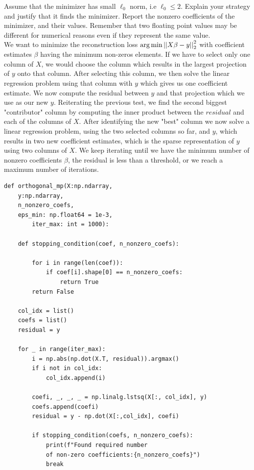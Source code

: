 \documentclass[12pt,twoside]{article}
\begin{document}
\begin{enumerate}
\begin{enumerate}
    Assume that the minimizer has small $\ell_0$ norm, i.e $\ell_0 \leq 2$. Explain your strategy and justify that it finds the minimizer.  
    Report the nonzero coefficients of the minimizer, and
    their values.  Remember that two floating point values may be different for numerical reasons even if they represent the same value.\\
    
    We want to minimize the reconstruction loss $\operatorname*{arg\,min}  \left|\left| X \beta - y \right|\right| _{2}^2$ with  coefficient estimates $\beta$ having the minimum non-zeros elements.
    If we have to select only one column of $X$, we would choose the column which results in the largest projection of $y$ onto that column. 
    After selecting this column, we then solve the linear regression problem using that column with $y$ which gives us one coefficient estimate. We now compute the residual 
    between $y$ and that projection which we use as our new $y$. Reiterating the previous test, we find the second biggest "contributor" column by computing the inner product
    between the $residual$ and each of the columns of $X$. After identifying the new "best" column we now solve a linear regression problem, using the two selected columns so far, and $y$, which results in
    two new coefficient estimates, which is the sparse representation of $y$ using two columns of $X$. We keep iterating until we have the minimum number of nonzero coefficients $\beta$, the residual is less than a threshold, or we reach a maximum number of iterations.
    
 \begin{verbatim} 
def orthogonal_mp(X:np.ndarray, 
	y:np.ndarray, 
	n_nonzero_coefs,  
	eps_min: np.float64 = 1e-3,
        iter_max: int = 1000):

    def stopping_condition(coef, n_nonzero_coefs):
        
        for i in range(len(coef)):
            if coef[i].shape[0] == n_nonzero_coefs:
                return True
        return False
        
    col_idx = list()
    coefs = list()
    residual = y   
    
    for _ in range(iter_max):
        i = np.abs(np.dot(X.T, residual)).argmax()
        if i not in col_idx:
            col_idx.append(i)
        
        coefi, _, _, _ = np.linalg.lstsq(X[:, col_idx], y)
        coefs.append(coefi)
        residual = y - np.dot(X[:,col_idx], coefi)
        
        if stopping_condition(coefs, n_nonzero_coefs):
            print(f"Found required number 
            of non-zero coefficients:{n_nonzero_coefs}")
            break
            

\end{verbatim}
\end{enumerate}
\end{enumerate}
\end{document}
